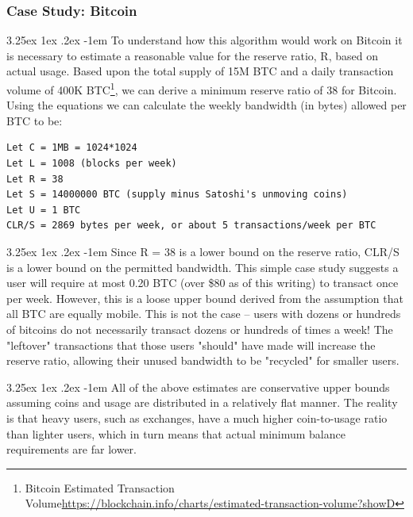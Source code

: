 \documentclass{article}
\makeatletter
\renewcommand\paragraph{\@startsection{paragraph}{5}{\z@}%
  {3.25ex \@plus1ex \@minus.2ex}%
  {-1em}%
  {\normalfont\normalsize\bfseries}}
\makeatother
\begin{document}
            \subsubsection{Case Study: Bitcoin}

                \paragraph{}
                    To understand how this algorithm would work on Bitcoin it is necessary to estimate a reasonable value for the reserve ratio, R, based on actual usage. Based upon the total supply of 15M BTC and a daily transaction volume of 400K BTC\footnote{Bitcoin Estimated Transaction Volume\newline\url{https://blockchain.info/charts/estimated-transaction-volume?showD}}, we can derive a minimum reserve ratio of 38 for Bitcoin. Using the equations we can calculate the weekly bandwidth (in bytes) allowed per BTC to be:

                \begin{lstlisting}
Let C = 1MB = 1024*1024
Let L = 1008 (blocks per week)
Let R = 38
Let S = 14000000 BTC (supply minus Satoshi's unmoving coins)
Let U = 1 BTC
CLR/S = 2869 bytes per week, or about 5 transactions/week per BTC
                \end{lstlisting}

                \paragraph{}
                    Since R = 38 is a lower bound on the reserve ratio, CLR/S is a lower bound on the permitted bandwidth. This simple case study suggests a user will require at most 0.20 BTC (over \$80 as of this writing) to transact once per week. However, this is a loose upper bound derived from the assumption that all BTC are equally mobile. This is not the case -- users with dozens or hundreds of bitcoins do not necessarily transact dozens or hundreds of times a week! The "leftover" transactions that those users "should" have made will increase the reserve ratio, allowing their unused bandwidth to be "recycled" for smaller users.

                \paragraph{}
                    All of the above estimates are conservative upper bounds assuming coins and usage are distributed in a relatively flat manner. The reality is that heavy users, such as exchanges, have a much higher coin-to-usage ratio than lighter users, which in turn means that actual minimum balance requirements are far lower.
\end{document}
